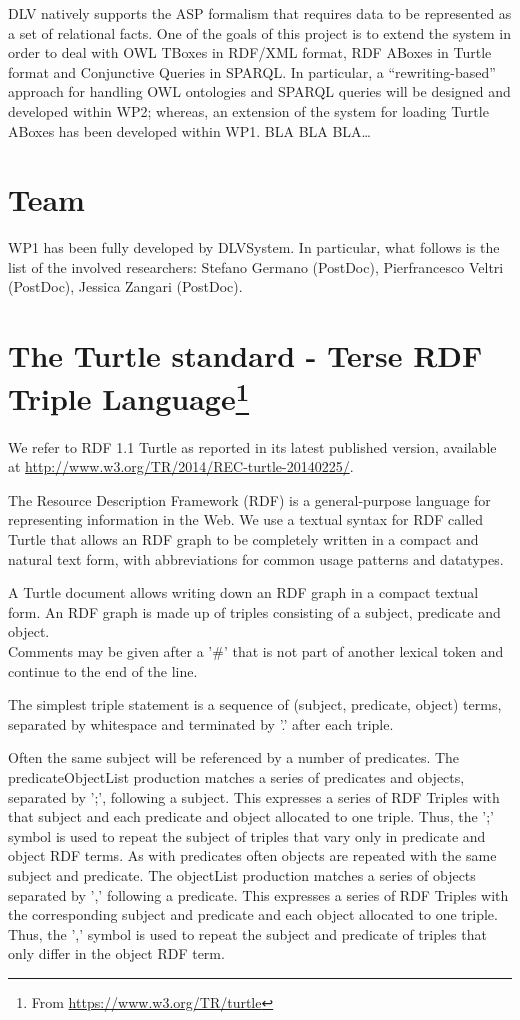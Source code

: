 \documentclass[oneside]{book}
\begin{document}
DLV natively supports the ASP formalism that requires data to be represented as a set of relational facts. One of the goals of this project is to extend the system in order to deal with OWL TBoxes in RDF/XML format, RDF ABoxes in Turtle format and Conjunctive Queries in SPARQL. In particular, a ``rewriting-based'' approach for handling OWL ontologies and SPARQL queries will be designed and developed within WP2; whereas, an extension of the system for loading Turtle ABoxes has been developed within WP1. 
BLA BLA BLA…

\section{Team}
WP1 has been fully developed by DLVSystem. In particular, what follows is the list of the involved researchers: Stefano Germano (PostDoc), Pierfrancesco Veltri (PostDoc), Jessica Zangari (PostDoc).



\section{The Turtle standard - Terse RDF Triple Language\texorpdfstring{\protect\footnote{From \url{https://www.w3.org/TR/turtle}}}{}}

We refer to RDF 1.1 Turtle as reported in its latest published version, available at \url{http://www.w3.org/TR/2014/REC-turtle-20140225/}.

The Resource Description Framework (RDF) is a general-purpose language for representing information in the Web.
We use a textual syntax for RDF called Turtle that allows an RDF graph to be completely written in a compact and natural text form, with abbreviations for common usage patterns and datatypes.

A Turtle document allows writing down an RDF graph in a compact textual form. An RDF graph is made up of triples consisting of a subject, predicate and object.\\
Comments may be given after a '\#' that is not part of another lexical token and continue to the end of the line.

The simplest triple statement is a sequence of (subject, predicate, object) terms, separated by whitespace and terminated by '.' after each triple.

Often the same subject will be referenced by a number of predicates. The predicateObjectList production matches a series of predicates and objects, separated by ';', following a subject. This expresses a series of RDF Triples with that subject and each predicate and object allocated to one triple. Thus, the ';' symbol is used to repeat the subject of triples that vary only in predicate and object RDF terms.
As with predicates often objects are repeated with the same subject and predicate. The objectList production matches a series of objects separated by ',' following a predicate. This expresses a series of RDF Triples with the corresponding subject and predicate and each object allocated to one triple. Thus, the ',' symbol is used to repeat the subject and predicate of triples that only differ in the object RDF term.
\end{document}
